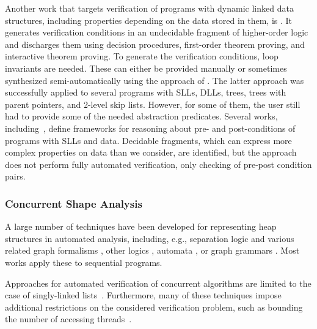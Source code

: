 Another work that targets verification of programs with dynamic linked data
structures, including properties depending on the data stored in them, is
\cite{Zee:pldi08}. It generates verification conditions in an undecidable
fragment of higher-order logic and discharges them using decision procedures,
first-order theorem proving, and interactive theorem proving. To generate the
verification conditions, loop invariants are needed. These can either be
provided manually or sometimes synthesized semi-automatically using the approach
of \cite{wies07hav}. The latter approach was successfully applied to several
programs with SLLs, DLLs, trees, trees with parent pointers, and 2-level skip
lists. However, for some of them, the user still had to provide some of the
needed abstraction predicates.
Several works, including~\cite{dragoi:atva12}, define frameworks for reasoning
about pre- and post-conditions of programs with SLLs and data. Decidable
fragments, which can express more complex properties on data than we consider,
are identified, but the approach does not perform fully automated verification,
only checking of pre-post condition pairs.


\subsubsection{Concurrent Shape Analysis}
A large number of techniques have been developed for representing heap structures
in automated analysis, including,
e.g., separation logic and various related graph formalisms
\cite{InvaderCAV08,rival11,dudka13}, other logics \cite{SRW:threevalued},
automata \cite{boxes13}, or graph grammars \cite{Jonathan:Shape}. 
Most works apply these to sequential programs.

Approaches for automated verification of concurrent algorithms are limited to the
case of singly-linked
lists~\cite{AHHR:integrated:short,meyer:vmcai16,Quy:sas16,Sagiv:correlation,Vafeiadis:cav10}.
Furthermore, many of these techniques impose additional restrictions on the considered verification problem, such as bounding the number of accessing
threads~\cite{Amit:comparisonAbstraction,Vechev:spin09,CernyRZCA:CAV10}.

